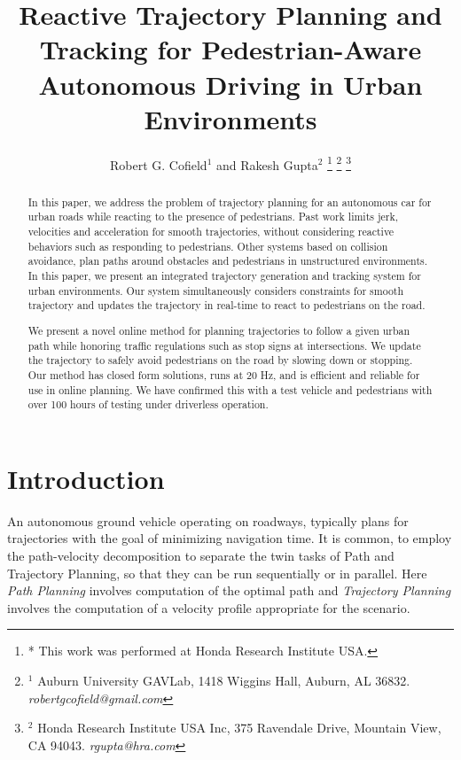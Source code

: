 \documentclass[letterpaper, 10 pt, conference]{ieeeconf}  %
\title{\LARGE \bf
  Reactive Trajectory Planning and Tracking for Pedestrian-Aware Autonomous Driving in Urban Environments
}
\author{
  Robert G. Cofield$^{1}$ and
  Rakesh Gupta$^{2}$
  \thanks{
    * This work was performed at Honda Research Institute USA.
  }
  \thanks{
    $^{1}$ Auburn University GAVLab, 1418 Wiggins Hall, Auburn, AL 36832. \textit{robertgcofield@gmail.com}
  }
  \thanks{
    $^{2}$ Honda Research Institute USA Inc, 375 Ravendale Drive, Mountain View, CA 94043. \textit{rgupta@hra.com}
  }
}
\begin{document}
\maketitle
\thispagestyle{empty}
\pagestyle{empty}

\begin{abstract}
In this paper, we address the problem of trajectory planning for an autonomous car for urban roads while reacting to the presence of pedestrians.
Past work limits jerk, velocities and acceleration for smooth trajectories, without considering reactive behaviors such as responding to pedestrians.
Other systems based on collision avoidance, plan paths around obstacles and pedestrians in unstructured environments.
In this paper, we present an integrated trajectory generation and tracking system for urban environments. Our system simultaneously considers constraints for smooth trajectory and updates the trajectory in real-time to react to pedestrians on the road. 

We present a novel online method for planning %
trajectories to follow a given urban path while honoring traffic regulations such as stop signs at intersections. 
We update the trajectory to safely avoid pedestrians on the road by slowing down or stopping.
Our method has closed form solutions, runs at 20 Hz, and is efficient and reliable for use in online planning.
We have confirmed this with a test vehicle and pedestrians with over 100 hours of testing under driverless operation.

\end{abstract}

\section{Introduction} \label{sec:introduction}

An autonomous ground vehicle operating on roadways, typically plans for trajectories with the goal of minimizing navigation time.
It is common, to employ the path-velocity decomposition to separate the twin tasks of Path and Trajectory Planning, so that they can be run sequentially or in parallel.
Here {\it Path Planning} involves computation of the optimal path and {\it Trajectory Planning} involves the computation of a velocity profile appropriate for the scenario.
\end{document}
